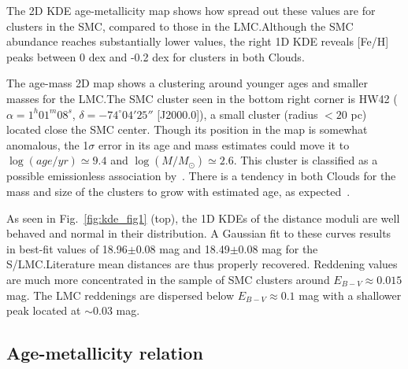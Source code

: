 \documentclass{aa}
\begin{document}
The 2D KDE age-metallicity map shows how spread out these values are for
clusters in the SMC, compared to those in the LMC.\@ Although the SMC abundance
reaches substantially lower values, the right 1D KDE reveals [Fe/H] peaks
between 0 dex and -0.2 dex for clusters in both Clouds.

The age-mass 2D map shows a clustering around younger ages and smaller masses
for the LMC.\@ The SMC cluster seen in the bottom right corner is HW42
($\alpha{=}1^h01^m08^s$, $\delta{=}-74^\circ04'25''$ [J2000.0]),
a small cluster (radius ${<}20$ pc) located close the SMC center. Though
its position in the map is somewhat anomalous, the 1$\sigma$ error in its age
and mass estimates could move it to
$\log(age/yr){\simeq}9.4$ and $\log(M/M_{\odot}){\simeq}2.6$. This cluster is
classified as a possible emissionless association by~\mbox{\cite{Bica_1995}}.
%
There is a tendency in both Clouds for the mass and size of the clusters to
grow with estimated age, as expected~\citep[due to the mass-to-light ratio
increase with age; see][Sect. 4]{Popescu_2012}.

As seen in Fig.~\ref{fig:kde_fig1} (top), the 1D KDEs of the distance
moduli are well behaved and normal in their distribution.
A Gaussian fit to these curves results in best-fit values of 18.96$\pm$0.08 mag
and 18.49$\pm$0.08 mag for the S/LMC.\@ Literature mean distances are thus
properly recovered.
%
Reddening values are much more concentrated in the sample of SMC clusters
around $E_{B-V}{\approx}0.015$ mag. The LMC reddenings are dispersed below $E_{B-V}
{\approx}0.1$ mag with a shallower peak located at ${\sim}0.03$ mag.
%


\subsection{Age-metallicity relation}
\label{ssec:amr}
\end{document}
